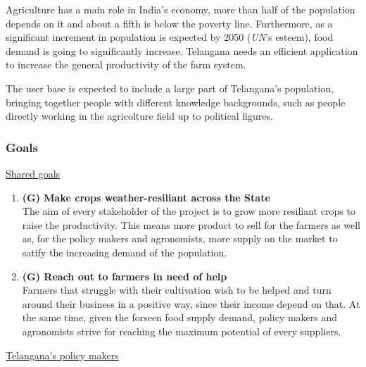 \documentclass[table, 12pt]{article}
\begin{document}
Agriculture has a main role in India's economy, more than half of the population depends on it and about a fifth is below the poverty line.
Furthermore, as a significant increment in population is expected by 2050 (\emph{UN}'s esteem), food demand is going to significantly increase.
Telangana needs an efficient application to increase the general productivity of the farm system.

The user base is expected to include a large part of Telangana's population, bringing together people with different knowledge backgrounds, such as people directly working in the agricolture field up to political figures.

\subsubsection{Goals}
\underline{Shared goals}
\begin{enumerate}
    \item \textbf{(G) Make crops weather-resiliant across the State} \\ The aim of every stakeholder of the project is to grow more resiliant crops to raise the productivity. This means more product to sell for the farmers as well as, for the policy makers and agronomists, more supply on the market to satify the increasing demand of the population.
    \item  \textbf{(G) Reach out to farmers in need of help} \\ Farmers that struggle with their cultivation wish to be helped and turn around their business in a positive way, since their income depend on that. At the same time, given the forseen food supply demand, policy makers and agronomists strive for reaching the maximum potential of every suppliers.
\end{enumerate}
\underline{Telangana's policy makers}
\end{document}
